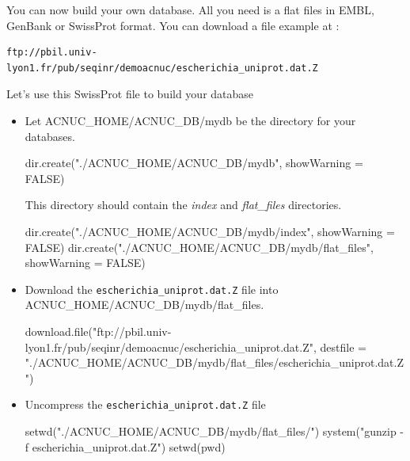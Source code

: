 \documentclass{article}
\begin{document}
You can now build your own database.
All you need is a flat files
in EMBL, GenBank or SwissProt format. You can download a file example at :
\begin{verbatim}
ftp://pbil.univ-lyon1.fr/pub/seqinr/demoacnuc/escherichia_uniprot.dat.Z
\end{verbatim}

Let's use this SwissProt file to build your database
\begin{itemize}

\item Let ACNUC\_HOME/ACNUC\_DB/mydb be the directory for your databases.


\begin{Schunk}
\begin{Sinput}
 dir.create("./ACNUC_HOME/ACNUC_DB/mydb", showWarning = FALSE)
\end{Sinput}
\end{Schunk}
This directory should contain the  \textit{index} and \textit{flat\_files} directories.

\begin{Schunk}
\begin{Sinput}
 dir.create("./ACNUC_HOME/ACNUC_DB/mydb/index", showWarning = FALSE)
 dir.create("./ACNUC_HOME/ACNUC_DB/mydb/flat_files", showWarning = FALSE)
\end{Sinput}
\end{Schunk}

\item Download the \texttt{escherichia\_uniprot.dat.Z} file into ACNUC\_HOME/ACNUC\_DB/mydb/flat\_files.

\begin{Schunk}
\begin{Sinput}
 download.file("ftp://pbil.univ-lyon1.fr/pub/seqinr/demoacnuc/escherichia_uniprot.dat.Z", 
     destfile = "./ACNUC_HOME/ACNUC_DB/mydb/flat_files/escherichia_uniprot.dat.Z")
\end{Sinput}
\end{Schunk}


\item Uncompress the \texttt{escherichia\_uniprot.dat.Z} file 

\begin{Schunk}
\begin{Sinput}
 setwd("./ACNUC_HOME/ACNUC_DB/mydb/flat_files/")
 system("gunzip -f escherichia_uniprot.dat.Z")
 setwd(pwd)
\end{Sinput}
\end{Schunk}



\end{itemize}
\end{document}
